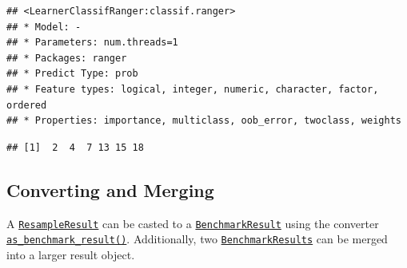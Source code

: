 \documentclass[
]{scrbook}
\newenvironment{Shaded}{\begin{snugshade}}{\end{snugshade}}
\newcommand{\CommentTok}[1]{\textcolor[rgb]{0.56,0.35,0.01}{\textit{#1}}}
\newcommand{\FunctionTok}[1]{\textcolor[rgb]{0.00,0.00,0.00}{#1}}
\newcommand{\NormalTok}[1]{#1}
\newcommand{\OtherTok}[1]{\textcolor[rgb]{0.56,0.35,0.01}{#1}}
\newcommand{\SpecialCharTok}[1]{\textcolor[rgb]{0.00,0.00,0.00}{#1}}
\newcommand{\StringTok}[1]{\textcolor[rgb]{0.31,0.60,0.02}{#1}}
\renewenvironment{Shaded} {\begin{snugshade}\small} {\end{snugshade}}
\begin{document}
\begin{verbatim}
## <LearnerClassifRanger:classif.ranger>
## * Model: -
## * Parameters: num.threads=1
## * Packages: ranger
## * Predict Type: prob
## * Feature types: logical, integer, numeric, character, factor, ordered
## * Properties: importance, multiclass, oob_error, twoclass, weights
\end{verbatim}

\begin{Shaded}
\end{Shaded}

\begin{verbatim}
## [1]  2  4  7 13 15 18
\end{verbatim}

\hypertarget{converting-and-merging}{%
\subsection{Converting and Merging}\label{converting-and-merging}}

A \href{https://mlr3.mlr-org.com/reference/ResampleResult.html}{\texttt{ResampleResult}} can be casted to a \href{https://mlr3.mlr-org.com/reference/BenchmarkResult.html}{\texttt{BenchmarkResult}} using the converter \href{https://mlr3.mlr-org.com/reference/as_benchmark_result.html}{\texttt{as\_benchmark\_result()}}.
Additionally, two \href{https://mlr3.mlr-org.com/reference/BenchmarkResult.html}{\texttt{BenchmarkResults}} can be merged into a larger result object.

\begin{Shaded}
\end{Shaded}
\end{document}
